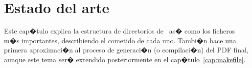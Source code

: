 %
%
%
%
%
%
%
%
%
%

\chapter{Estado del arte}
\label{cap2}

\begin{FraseCelebre}
\begin{Frase}
\end{Frase}
\begin{Fuente}
\end{Fuente}
\end{FraseCelebre}

\begin{resumen}
  Este cap�tulo explica la estructura de directorios de \texis\
  as� como los ficheros m�s importantes, describiendo el cometido de
  cada uno. Tambi�n hace una primera aproximaci�n al proceso de
  generaci�n (o compilaci�n) del PDF final, aunque este tema ser�
  extendido posteriormente en el
  cap�tulo~\ref{cap:makefile}.
\end{resumen}

